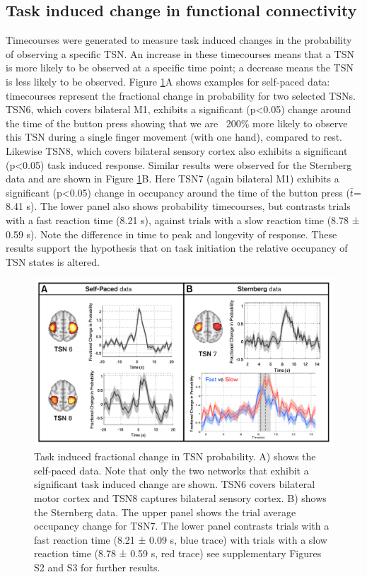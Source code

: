 \subsection{Task induced change in functional connectivity}
Timecourses were generated to measure task induced changes in the probability of observing a specific TSN. An increase in these timecourses means that a TSN is more likely to be observed at a specific time point; a decrease means the TSN is less likely to be observed. Figure \ref{figure_5_5}A shows examples for self-paced data: timecourses represent the fractional change in probability for two selected TSNs. TSN6, which covers bilateral M1, exhibits a significant (p<0.05) change around the time of the button press showing that we are ~200\% more likely to observe this TSN during a single finger movement (with one hand), compared to rest. Likewise TSN8, which covers bilateral sensory cortex also exhibits a significant (p<0.05) task induced response. Similar results were observed for the Sternberg data and are shown in Figure \ref{figure_5_5}B. Here TSN7 (again bilateral M1) exhibits a significant (p<0.05) change in occupancy around the time of the button press ($\bar{t}$= 8.41 s). The lower panel also shows probability timecourses, but contrasts trials with a fast reaction time (8.21 s), against trials with a slow reaction time (8.78 ± 0.59 s). Note the difference in time to peak and longevity of response. These results support the hypothesis that on task initiation the relative occupancy of TSN states is altered. 

	\begin{figure}[h]
		\begin{center}
			\includegraphics[width=\linewidth]{./images/chapter5/Figure_5.png}
			\caption{Task induced fractional change in TSN probability. A) shows the self-paced data. Note that only the two networks that exhibit a significant task induced change are shown. TSN6 covers bilateral motor cortex and TSN8 captures bilateral sensory cortex. B) shows the Sternberg data. The upper panel shows the trial average occupancy change for TSN7. The lower panel contrasts trials with a fast reaction time (8.21 ± 0.09 s, blue trace) with trials with a slow reaction time (8.78 ± 0.59 s, red trace) see supplementary Figures S2 and S3 for further results. \label{figure_5_5}}
		\end{center}
	\end{figure}

